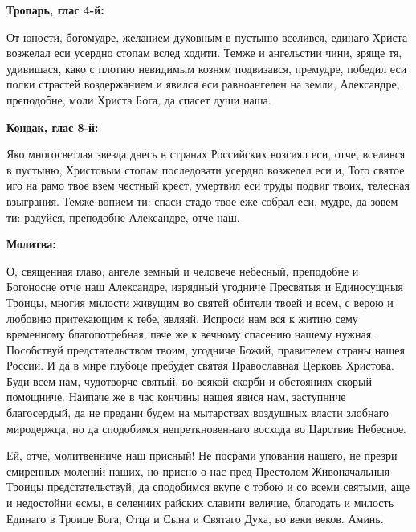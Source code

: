 \bigskip\bigskip\mychapterending

 
\bfseries Тропарь, глас 4-й:\normalfont{}


От юности, богомудре, желанием духовным в пустыню вселився, единаго Христа возжелал еси усердно стопам вслед ходити. Темже и ангельстии чини, зряще тя, удивишася, како с плотию невидимым козням подвизався, премудре, победил еси полки страстей воздержанием и явился еси равноангелен на земли, Александре, преподобне, моли Христа Бога, да спасет души наша.



\medskip
\bfseries Кондак, глас 8-й:\normalfont{}


Яко многосветлая звезда днесь в странах Российских возсиял еси, отче, вселився в пустыню, Христовым стопам последовати усердно возжелел еси и, Того святое иго на рамо твое взем честный крест, умертвил еси труды подвиг твоих, телесная взыграния. Темже вопием ти: спаси стадо твое еже собрал еси, мудре, да зовем ти: радуйся, преподобне Александре, отче наш. 


\medskip
\bfseries Молитва:\normalfont{}


О, священная главо, ангеле земный и человече небесный, преподобне и Богоносне отче наш Александре, изрядный угодниче Пресвятыя и Единосущныя Троицы, многия милости живущим во святей обители твоей и всем, с верою и любовию притекающим к тебе, являяй. Испроси нам вся к житию сему временному благопотребная, паче же к вечному спасению нашему нужная. Пособствуй предстательством твоим, угодниче Божий, правителем страны нашея России. И да в мире глубоце пребудет святая Православная Церковь Христова. Буди всем нам, чудотворче святый, во всякой скорби и обстояниях скорый помощниче. Наипаче же в час кончины нашея явися нам, заступниче благосердый, да не предани будем на мытарствах воздушных власти злобнаго миродержца, но да сподобимся непреткновеннаго восхода во Царствие Небесное. 


Ей, отче, молитвенниче наш присный! Не посрами упования нашего, не презри смиренных молений наших, но присно о нас пред Престолом Живоначальныя Троицы предстательствуй, да сподобимся вкупе с тобою и со всеми святыми, аще и недостойни есмы, в селениих райских славити величие, благодать и милость Единаго в Троице Бога, Отца и Сына и Святаго Духа, во веки веков. Аминь. 






